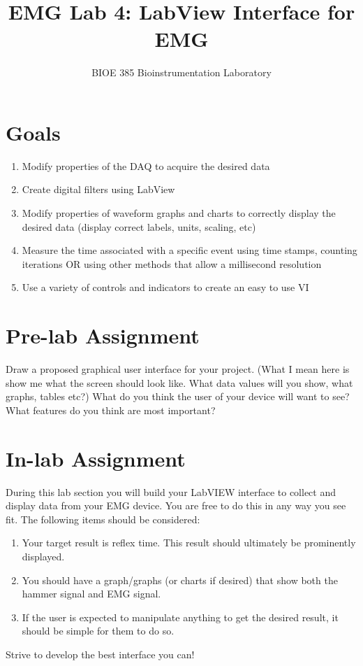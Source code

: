 \documentclass{article}
\title{EMG Lab 4: LabView Interface for EMG}
\author{BIOE 385 Bioinstrumentation Laboratory}
\date{}
\begin{document}
\large
\maketitle

\section*{Goals}
\begin{enumerate}
	\item Modify properties of the DAQ to acquire the desired data
	\item Create digital filters using LabView
	\item Modify properties of waveform graphs and charts to correctly display the desired data (display correct labels, units, scaling, etc)
	\item Measure the time associated with a specific event using time stamps, counting iterations OR using other methods that allow a millisecond resolution
	\item Use a variety of controls and indicators to create an easy to use VI
\end{enumerate}

\section*{Pre-lab Assignment}
Draw a proposed graphical user interface for your project. (What I mean here is show me what the screen should look like. What data values will you show, what graphs, tables etc?) What do you think the user of your device will want to see? What features do you think are most important? 

\section*{In-lab Assignment}
During this lab section you will build your LabVIEW interface to collect and display data from your EMG device. You are free to do this in any way you see fit. The following items should be considered:

\begin{enumerate}
	\item Your target result is reflex time. This result should ultimately be prominently displayed.
	\item You should have a graph/graphs (or charts if desired) that show both the hammer signal and EMG signal.
	\item If the user is expected to manipulate anything to get the desired result, it should be simple for them to do so.
\end{enumerate}

Strive to develop the best interface you can!
\end{document}
